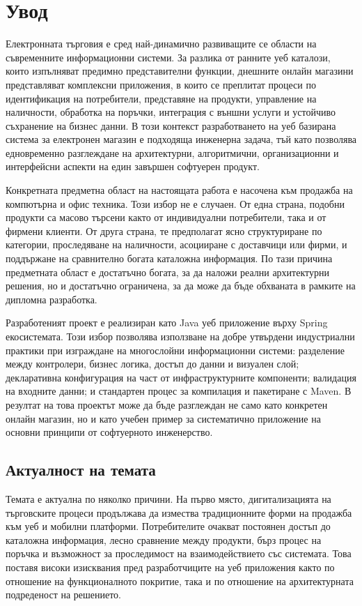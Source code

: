 \section{Увод}

Електронната търговия е сред най-динамично развиващите се области на съвременните информационни системи. За разлика от ранните уеб каталози, които изпълняват предимно представителни функции, днешните онлайн магазини представляват комплексни приложения, в които се преплитат процеси по идентификация на потребители, представяне на продукти, управление на наличности, обработка на поръчки, интеграция с външни услуги и устойчиво съхранение на бизнес данни. В този контекст разработването на уеб базирана система за електронен магазин е подходяща инженерна задача, тъй като позволява едновременно разглеждане на архитектурни, алгоритмични, организационни и интерфейсни аспекти на един завършен софтуерен продукт.

Конкретната предметна област на настоящата работа е насочена към продажба на компютърна и офис техника. Този избор не е случаен. От една страна, подобни продукти са масово търсени както от индивидуални потребители, така и от фирмени клиенти. От друга страна, те предполагат ясно структуриране по категории, проследяване на наличности, асоцииране с доставчици или фирми, и поддържане на сравнително богата каталожна информация. По тази причина предметната област е достатъчно богата, за да наложи реални архитектурни решения, но и достатъчно ограничена, за да може да бъде обхваната в рамките на дипломна разработка.

Разработеният проект е реализиран като Java уеб приложение върху Spring екосистемата. Този избор позволява използване на добре утвърдени индустриални практики при изграждане на многослойни информационни системи: разделение между контролери, бизнес логика, достъп до данни и визуален слой; декларативна конфигурация на част от инфраструктурните компоненти; валидация на входните данни; и стандартен процес за компилация и пакетиране с Maven. В резултат на това проектът може да бъде разглеждан не само като конкретен онлайн магазин, но и като учебен пример за систематично приложение на основни принципи от софтуерното инженерство.

\subsection{Актуалност на темата}

Темата е актуална по няколко причини. На първо място, дигитализацията на търговските процеси продължава да измества традиционните форми на продажба към уеб и мобилни платформи. Потребителите очакват постоянен достъп до каталожна информация, лесно сравнение между продукти, бърз процес на поръчка и възможност за проследимост на взаимодействието със системата. Това поставя високи изисквания пред разработчиците на уеб приложения както по отношение на функционалното покритие, така и по отношение на архитектурната подреденост на решението.


